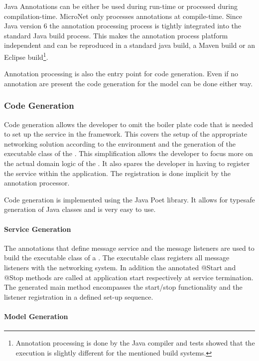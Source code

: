 Java Annotations can be either be used during run-time or processed during
compilation-time. MicroNet only processes annotations at compile-time. Since
Java version 6 the annotation processing process is tightly integrated into the
standard Java build process. This makes the annotation process platform
independent and can be reproduced in a standard java build, a Maven build or an
Eclipse build\footnote{Annotation processing is done by the Java compiler and
tests showed that the execution is slightly different for the mentioned build
systems.}.

Annotation processing is also the entry point for code generation. Even if no
annotation are present the code generation for the model can be done either way.

\subsubsection{Code Generation}

Code generation allows the developer to omit  the boiler plate code that is
needed to set up the service in the framework. This covers the setup of the
appropriate networking solution according to the environment and the generation
of the executable class of the \ms{}. This simplification allows the developer
to focus more on the actual domain logic of the \ms{}. It also spares the
developer in having to register the service within the application. The
registration is done implicit by the annotation processor.

Code generation is implemented using the Java Poet library. It allows for
typesafe generation of Java classes and is very easy to use. 

\paragraph{Service Generation}

The annotations that define message service and the message listeners are used
to build the executable class of a \ms{}. The executable class registers all
message listeners with the networking system. In addition the annotated @Start
and @Stop methods are called at application start respectively at service
termination. The generated main method encompasses the start/stop functionality
and the listener registration in a defined set-up sequence.

\paragraph{Model Generation}

